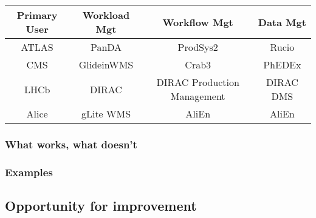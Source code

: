 \begin{center}
  \begin{tabular}{ c | c | c | c }
    \hline
    Primary User & Workload Mgt & Workflow Mgt & Data Mgt\\ \hline
    ATLAS & PanDA & ProdSys2 & Rucio\\ \hline
    CMS  & GlideinWMS & Crab3 & PhEDEx\\ \hline
    LHCb  & DIRAC & DIRAC Production Management & DIRAC DMS\\ \hline
    Alice  & gLite WMS & AliEn & AliEn\\ 
    \hline
  \end{tabular}
\end{center}




\subsubsection{What works, what doesn't}
\subsubsection{Examples}
\subsection{Opportunity for improvement}


